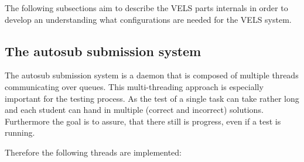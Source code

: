 The following subsections aim to describe the VELS parts internals in order to develop an
understanding what configurations are needed for the VELS system.

\newpage

\subsection{The autosub submission system} \label{sub:autosub}
The autosub submission system is a daemon that is composed of multiple threads
communicating over queues. This multi-threading approach is especially important
for the testing process. As the test of a single task can take rather long and
each student can hand in multiple (correct and incorrect) solutions. Furthermore
the goal is to assure, that there still is progress, even if a test is running.

Therefore the following threads are implemented:

